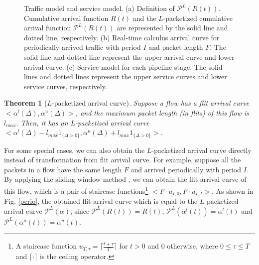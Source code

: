 \documentclass[preprint]{elsarticle}
\newtheorem{thm}{Theorem}
\def\QED{\mbox{\rule[0pt]{1.3ex}{1.3ex}}}
\begin{document}
\begin{figure}
  \caption{Traffic model and service model. (a) Definition of $\mathcal{P}^L(R(t))$. Cumulative arrival function $R(t)$ and the $L$-packetized cumulative arrival function $\mathcal{P}^L(R(t))$ are represented by the solid line and dotted line, respectively. (b) Real-time calculus arrival curve for periodically arrived traffic with period $I$ and packet length $F$. The solid line and dotted line represent the upper arrival curve and lower arrival curve. (c) Service model for each pipeline stage. The solid lines and dotted lines represent the upper service curves and lower service curves, respectively.}\label{ac}
\end{figure}
\begin{thm}[$L$-packetized arrival curve]\label{pktac}
Suppose a flow has a flit arrival curve $<\alpha^l(\Delta),\alpha^u(\Delta)>$, and the maximum packet length (in flits) of this flow is $l_{max}$. Then, it has an $L$-packetized arrival curve $<\alpha^l(\Delta)-l_{max}1_{\{\Delta>0\}},\alpha^u(\Delta)+l_{max}1_{\{\Delta>0\}}>$.
\end{thm}

For some special cases, we can also obtain the $L$-packetized arrival curve directly instead of transformation from flit arrival curve. For example, suppose all the packets in a flow have the same length $F$ and arrived periodically with period $I$. By applying the sliding window method \cite{1253607}, we can obtain the flit arrival curve of this flow, which is a pair of staircase functions\footnote{A staircase function $u_{T,\tau}=\lceil\frac{t+\tau}{T}\rceil$ for $t>0$ and 0 otherwise, where $0\leq \tau\leq T$ and $\lceil\cdot\rceil$ is the ceiling operator.} $<F\cdot u_{I,0},F\cdot u_{I,I}>$. As shown in Fig. \ref{perio}, the obtained flit arrival curve which is equal to the $L$-packetized arrival curve $\mathcal{P}^L(\alpha)$, since $\mathcal{P}^L(R(t))=R(t)$, $\mathcal{P}^L(\alpha^l(t))=\alpha^l(t)$ and $\mathcal{P}^L(\alpha^u(t))=\alpha^u(t)$.
\end{document}
